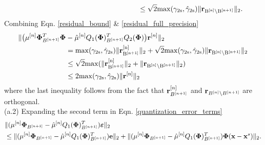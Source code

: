 \documentclass[aoas,preprint]{imsart}
\numberwithin{equation}{section}
\theoremstyle{plain}
\begin{document}
{{\begin{equation}
\begin{split}
&\ \ \ \ \ \ \ \ \ \ \ \ \ \ \ \ \ \ \ \ \ \ \ \ \ \ \ \ \ \ \ \ \ \ \ \ \ \ \ \ \ \ \ \ \ \ \ \ \  \ \ \leq \sqrt{2}\rm{max}(\gamma_{2s}, \hat{\gamma}_{2s})\| {\bf r}_{B^{[n]}\backslash B^{[n+1]}}\|_2.
    \end{split}
\end{equation}
}
Combining Eqn. \ref{residual_bound} \& \ref{residual_full_precision} 
\begin{equation}\label{first_term_main_theorem}
    \begin{split}
     \|\big(\mu^{[n]}{\bf \Phi}_{B^{[n+1]}}^T{\bf \Phi} &- \hat{\mu}^{[n]}Q_1({\bf \Phi})_{B^{[n+1]}}^T Q_2({\bf \Phi})\big) {\bf r}^{[n]} \|_2\\
     &= \rm{max}(\gamma_{2s}, \hat{\gamma}_{2s})\|{\bf r}_{B^{[n+1]}}^{[n]}\|_2 + \sqrt{2}\rm{max}(\gamma_{2s}, \hat{\gamma}_{2s})\|{\bf r}_{B^{[n]}\backslash B^{[n+1]}} \|_2\\
     &\leq \sqrt{2}\rm{max}(\|{\bf r}_{B^{[n+1]}}^{[n]}\|_2 + \|{\bf r}_{B^{[n]}\backslash B^{[n+1]}} \|_2)\\
     &\leq 2 \rm{max}(\gamma_{2s}, \hat{\gamma}_{2s})\|{\bf r}^{[n]} \|_2
    \end{split}
\end{equation}
where the last inequality follows from the fact that ${\bf r}_{B^{[n+1]}}^{[n]}$ and ${\bf r}_{B^{[n]}\backslash B^{[n+1]}}$ are orthogonal.\\

(a.2) Expanding the second term in Eqn. \ref{quantization_error_terms}
\begin{equation}
    \begin{split}
        &\|(\mu^{[n]}{\bf \Phi}_{B^{[n+1]}} - \hat{\mu}^{[n]}Q_1({\bf \Phi})_{B^{[n+1]}}^T)\boldsymbol{\varepsilon} \|_2 \\ &\leq\|(\mu^{[n]}{\bf \Phi}_{B^{[n+1]}} - \hat{\mu}^{[n]}Q_1({\bf \Phi})_{B^{[n+1]}}^T){\bf e} \|_2 + \|(\mu^{[n]}{\bf \Phi}_{B^{[n+1]}} - \hat{\mu}^{[n]}Q_1({\bf \Phi})_{B^{[n+1]}}^T){\bf \Phi} ({\bf x}-{\bf x}^s) \|_2.
    \end{split}
\end{equation}

}
\end{document}
